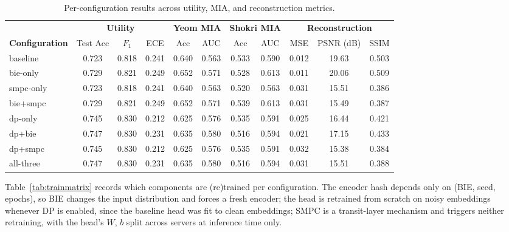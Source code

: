 \documentclass[conference]{IEEEtran}
\begin{document}
\begin{table}[htbp]
\caption{Per-configuration results across utility, MIA, and reconstruction metrics.}
\label{tab:results}
\centering
\renewcommand{\arraystretch}{1.15}
\begin{tabular}{lccc cc cc ccc}
\toprule
 & \multicolumn{3}{c}{\textbf{Utility}} & \multicolumn{2}{c}{\textbf{Yeom MIA}} & \multicolumn{2}{c}{\textbf{Shokri MIA}} & \multicolumn{3}{c}{\textbf{Reconstruction}} \\
\cmidrule(lr){2-4}\cmidrule(lr){5-6}\cmidrule(lr){7-8}\cmidrule(lr){9-11}
\textbf{Configuration} & Test Acc & $F_1$ & ECE & Acc & AUC & Acc & AUC & MSE & PSNR (dB) & SSIM \\
\midrule
baseline         & 0.723 & 0.818 & 0.241 & 0.640 & 0.563 & 0.533 & 0.590 & 0.012 & 19.63 & 0.503 \\
bie-only         & 0.729 & 0.821 & 0.249 & 0.652 & 0.571 & 0.528 & 0.613 & 0.011 & 20.06 & 0.509 \\
smpc-only        & 0.723 & 0.818 & 0.241 & 0.640 & 0.563 & 0.520 & 0.563 & 0.031 & 15.51 & 0.386 \\
bie+smpc         & 0.729 & 0.821 & 0.249 & 0.652 & 0.571 & 0.539 & 0.613 & 0.031 & 15.49 & 0.387 \\
\midrule
dp-only          & 0.745 & 0.830 & 0.212 & 0.625 & 0.576 & 0.535 & 0.591 & 0.025 & 16.44 & 0.421 \\
dp+bie           & 0.747 & 0.830 & 0.231 & 0.635 & 0.580 & 0.516 & 0.594 & 0.021 & 17.15 & 0.433 \\
dp+smpc          & 0.745 & 0.830 & 0.212 & 0.625 & 0.576 & 0.535 & 0.591 & 0.032 & 15.38 & 0.384 \\
all-three        & 0.747 & 0.830 & 0.231 & 0.635 & 0.580 & 0.516 & 0.594 & 0.031 & 15.51 & 0.388 \\
\bottomrule
\end{tabular}
\end{table}

Table~\ref{tab:trainmatrix} records which components are (re)trained per configuration. The encoder hash depends only on (BIE, seed, epochs), so BIE changes the input distribution and forces a fresh encoder; the head is retrained from scratch on noisy embeddings whenever DP is enabled, since the baseline head was fit to clean embeddings; SMPC is a transit-layer mechanism and triggers neither retraining, with the head's $W$, $b$ split across servers at inference time only.
\end{document}
